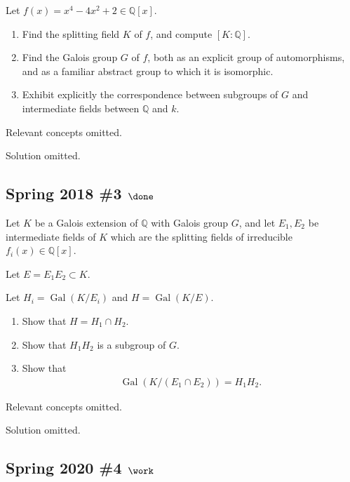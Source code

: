 Let \(f(x) = x^4 - 4x^2 + 2 \in {\mathbb{Q}}[x]\).

\begin{enumerate}
\def\labelenumi{\alph{enumi}.}
\item
  Find the splitting field \(K\) of \(f\), and compute
  \([K: {\mathbb{Q}}]\).
\item
  Find the Galois group \(G\) of \(f\), both as an explicit group of
  automorphisms, and as a familiar abstract group to which it is
  isomorphic.
\item
  Exhibit explicitly the correspondence between subgroups of \(G\) and
  intermediate fields between \({\mathbb{Q}}\) and \(k\).
\end{enumerate}


Relevant concepts omitted.

Solution omitted.

\hypertarget{spring-2018-3-done}{%
\subsection{\texorpdfstring{Spring 2018 \#3
\(\done\)}{Spring 2018 \#3 \textbackslash done}}\label{spring-2018-3-done}}

Let \(K\) be a Galois extension of \({\mathbb{Q}}\) with Galois group
\(G\), and let \(E_1 , E_2\) be intermediate fields of \(K\) which are
the splitting fields of irreducible \(f_i (x) \in {\mathbb{Q}}[x]\).

Let \(E = E_1 E_2 \subset K\).

Let \(H_i = \operatorname{Gal}(K/E_i)\) and
\(H = \operatorname{Gal}(K/E)\).

\begin{enumerate}
\def\labelenumi{\alph{enumi}.}
\item
  Show that \(H = H_1 \cap H_2\).
\item
  Show that \(H_1 H_2\) is a subgroup of \(G\).
\item
  Show that
  \begin{align*}
  \operatorname{Gal}(K/(E_1 \cap E_2 )) = H_1 H_2
  .\end{align*}
\end{enumerate}

Relevant concepts omitted.

Solution omitted.

\hypertarget{spring-2020-4-work}{%
\subsection{\texorpdfstring{Spring 2020 \#4
\(\work\)}{Spring 2020 \#4 \textbackslash work}}\label{spring-2020-4-work}}

